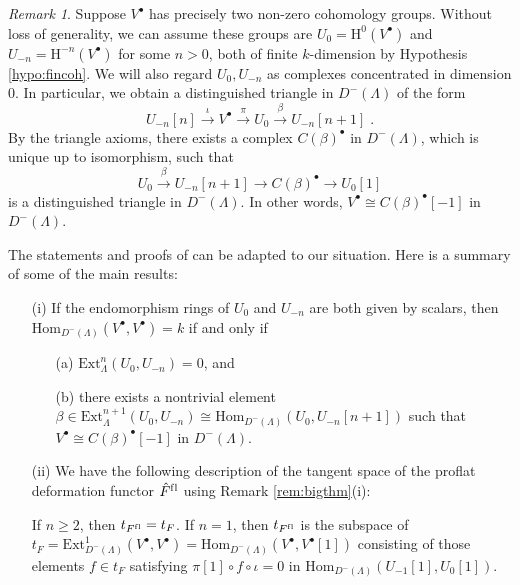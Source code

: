 \documentclass{amsart}
\theoremstyle{plain}
\theoremstyle{definition}
\theoremstyle{remark}
\newtheorem{rem}[thm]{Remark}
\begin{document}
\begin{rem}
\label{rem:2term}
Suppose $V^\bullet$ has precisely two non-zero cohomology groups. Without
loss of generality, we can assume these groups are $U_0={\mathrm{H}}^0(V^\bullet)$ and
$U_{-n}={\mathrm{H}}^{-n}(V^\bullet)$ for some $n > 0$,  both of finite $k$-dimension by Hypothesis
\ref{hypo:fincoh}. 
We will also regard $U_0,U_{-n}$ as complexes concentrated in dimension $0$. 
In particular, we obtain a distinguished triangle  in $D^-(\Lambda)$ of the form
\begin{equation}
\label{eq:anotherone}
U_{-n}[n] \xrightarrow{\iota} V^\bullet \xrightarrow{\pi} U_0
\xrightarrow{\beta} U_{-n}[n+1]\;.
\end{equation}
By the triangle axioms, there exists a complex $C(\beta)^\bullet$
in $D^-(\Lambda)$, which is unique up to isomorphism, such that 
$$U_0 \xrightarrow{\beta}  U_{-n}[n+1] \to C(\beta)^\bullet \to U_0[1]$$
is a distinguished triangle in $D^-(\Lambda)$. In other words, 
$V^\bullet \cong C(\beta)^\bullet[-1]$ in $D^-(\Lambda)$.

The statements and proofs of 
\cite[Prop. 9.3, Cor. 9.4, Props. 9.6 and 9.7]{bcderived} can be adapted to our situation. Here 
is a summary of some of the main results:

\begin{enumerate}
\item[(i)] If
the endomorphism rings of $U_0$ and $U_{-n}$ are both given
by scalars, then $\mathrm{Hom}_{D^-(\Lambda)}(V^\bullet,V^\bullet)= k$
if and only if
\begin{enumerate}
\item[(a)] $\mathrm{Ext}^n_{\Lambda}(U_0,U_{-n})=0$, and
\item[(b)] there exists a nontrivial element
$\beta\in\mathrm{Ext}^{n+1}_{\Lambda}(U_0,U_{-n})\cong
\mathrm{Hom}_{D^-(\Lambda)}(U_0,U_{-n}[n+1])$
such that $V^\bullet\cong C(\beta)^\bullet[-1]$
in $D^-(\Lambda)$.
\end{enumerate}

\item[(ii)]
We have the following description of the tangent space of the proflat deformation
functor $\hat{F}^{\mathrm{f\/l}}$ using Remark \ref{rem:bigthm}(i):

If $n\geq 2$, then $t_{F^{\mathrm{f\/l}}}=t_F$.
If $n=1$, then $t_{F^{\mathrm{f\/l}}}$ is the subspace of
$t_F=\mathrm{Ext}^1_{D^-(\Lambda)}(V^\bullet,V^\bullet)=
\mathrm{Hom}_{D^-(\Lambda)}(V^\bullet,V^\bullet[1])$
consisting of those elements $f\in t_F$ satisfying
$\pi[1]\circ f\circ \iota=0$ in $\mathrm{Hom}_{D^-(\Lambda)}(U_{-1}[1],U_0[1])$.


\end{enumerate}
\end{rem}
\end{document}
